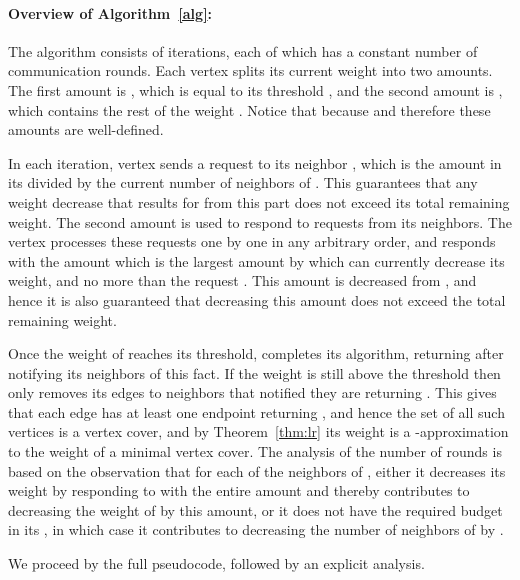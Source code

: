 \documentclass[11pt]{article}
\begin{document}
\paragraph{Overview of Algorithm~\ref{alg}:} The algorithm consists of iterations, each of which has a constant number of communication rounds. Each vertex  splits its current weight  into two amounts. The first amount is , which is equal to its threshold , and the second amount is , which contains the rest of the weight . Notice that  because  and therefore these amounts are well-defined.

In each iteration, vertex  sends a  request to its neighbor , which is the amount in its  divided by the current number of neighbors of . This guarantees that any weight decrease that results for  from this part does not exceed its total remaining weight. The second amount is used to respond to  requests from its neighbors. The vertex  processes these requests one by one in any arbitrary order, and responds with the amount  which is the largest amount by which  can currently decrease its weight, and no more than the request . This amount is decreased from , and hence it is also guaranteed that decreasing this amount does not exceed the total remaining weight.

Once the weight of  reaches its threshold,  completes its algorithm, returning  after notifying its neighbors of this fact. If the weight is still above the threshold then  only removes its edges to neighbors that notified they are returning . This gives that each edge has at least one endpoint returning , and hence the set of all such vertices is a vertex cover, and by Theorem~\ref{thm:lr} its weight is a -approximation to the weight of a minimal vertex cover. The analysis of the number of rounds is based on the observation that for each of the neighbors  of , either it decreases its weight by responding to  with the entire amount and thereby contributes to decreasing the weight of  by this amount, or it does not have the required budget in its , in which case it contributes to decreasing the number of neighbors of  by .

We proceed by the full pseudocode, followed by an explicit analysis.
\end{document}
